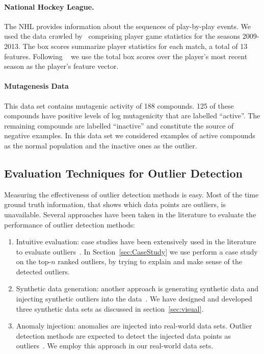 {				\paragraph{National Hockey League.} 
				The NHL provides information about the sequences of play-by-play events. We used the data crawled by~\citet{schulte2014aggregating} comprising player game statistics for the seasons 2009-2013. The box scores summarize player statistics for each match, a total of 13 features. Following ~\citeauthor{schulte2014aggregating} we use the total box scores over the player's most recent season as the player's feature vector.
				
				\paragraph{Mutagenesis Data}
				This data set contains mutagenic activity of 188 compounds. 125 of these compounds have positive levels of log mutagenicity that are labelled ``active''.  The remaining compounds are labelled ``inactive'' and constitute the source of negative examples. In this data set we considered examples of active compounds as the normal population and the inactive ones as the outlier. 
				
				\subsection{Evaluation Techniques for Outlier Detection}
				
				Measuring the effectiveness of outlier detection methods is easy. Most of the time ground truth information, that shows which data points are outliers, is unavailable. 
				Several approaches have been taken in the literature to evaluate the performance of outlier detection methods:
				\begin{enumerate}
					\item Intuitive evaluation: case studies have been extensively used in the literature to evaluate outliers~\citet{aggarwal2013}. In Section~\ref{sec:CaseStudy} we use perform a case study on the top-$n$ ranked outliers,  by trying to explain and make sense of the detected outliers. 	
					\item Synthetic data generation: another approach is generating synthetic data and injecting synthetic outliers into the data~\citet{aggarwal2013}. We have designed and developed three synthetic data sets as discussed in section~\ref{sec:visual}.
					\item Anomaly injection: anomalies are injected into real-world data sets. Outlier detection methods are expected to detect the injected data points as outliers~\citep{Akoglu2015}. We employ this approach in our real-world data sets.
					\end{enumerate}
					
}
